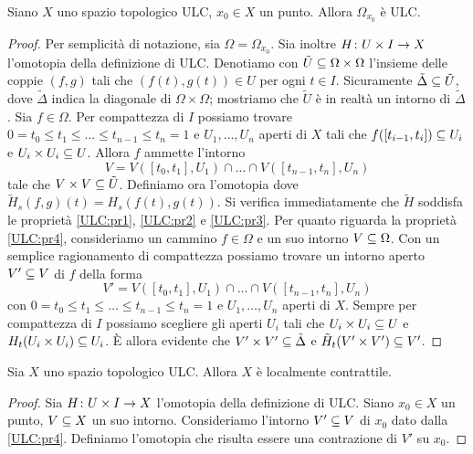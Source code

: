 \begin{proposition}
Siano \(X\) uno spazio topologico ULC, \(x_0\in X\) un punto. Allora \(\Omega_{x_0}\) è ULC.
\end{proposition}
\begin{proof}
Per semplicità di notazione, sia \(\Omega=\Omega_{x_0}\). Sia inoltre \(\map{H}{U\times I}{X}\) l'omotopia della definizione di ULC. Denotiamo con \(\tilde{U}\subseteq\Omega\times\Omega\) l'insieme delle coppie \((f,g)\) tali che \((f(t),g(t))\in U\) per ogni \(t\in I\). Sicuramente \(\tilde\Delta\subseteq\tilde U\), dove \(\tilde\Delta\) indica la diagonale di \(\Omega\times\Omega\); mostriamo che \(\tilde U\) è in realtà un intorno di \(\tilde\Delta\). Sia \(f\in\Omega\). Per compattezza di \(I\) possiamo trovare \(0=t_0\le t_1\le\ldots\le t_{n-1}\le t_n=1\) e \(U_1,\ldots,U_n\) aperti di \(X\) tali che \(f([t_{i-1},t_i])\subseteq U_i\) e \(U_i\times U_i\subseteq U\). Allora \(f\) ammette l'intorno
\[
V=V([t_0,t_1],U_1)\cap\ldots\cap V([t_{n-1},t_n],U_n)
\]
tale che \(V\times V\subseteq\tilde{U}\). Definiamo ora l'omotopia
dove \(\tilde{H}_s(f,g)(t)=H_s(f(t),g(t))\). Si verifica immediatamente che \(\tilde{H}\) soddisfa le proprietà \ref{ULC:pr1}, \ref{ULC:pr2} e \ref{ULC:pr3}. Per quanto riguarda la proprietà \ref{ULC:pr4}, consideriamo un cammino \(f\in\Omega\) e un suo intorno \(V\subseteq\Omega\). Con un semplice ragionamento di compattezza possiamo trovare un intorno aperto \(V'\subseteq V\) di \(f\) della forma
\[
V'=V([t_0,t_1],U_1)\cap\ldots\cap V([t_{n-1},t_n],U_n)
\]
con \(0=t_0\le t_1\le\ldots\le t_{n-1}\le t_n=1\) e \(U_1,\ldots,U_n\) aperti di \(X\). Sempre per compattezza di \(I\) possiamo scegliere gli aperti \(U_i\) tali che \(U_i\times U_i\subseteq U\) e \(H_t(U_i\times U_i)\subseteq U_i\). È allora evidente che \(V'\times V'\subseteq\tilde\Delta\) e \(\tilde{H}_t(V'\times V')\subseteq V'\).
\end{proof}

\begin{proposition}
Sia \(X\) uno spazio topologico ULC. Allora \(X\) è localmente contrattile.
\end{proposition}
\begin{proof}
Sia \(\map{H}{U\times I}{X}\) l'omotopia della definizione di ULC. Siano \(x_0\in X\) un punto, \(V\subseteq X\) un suo intorno. Consideriamo l'intorno \(V'\subseteq V\) di \(x_0\) dato dalla \ref{ULC:pr4}. Definiamo l'omotopia
che risulta essere una contrazione di \(V'\) su \(x_0\).
\end{proof}

